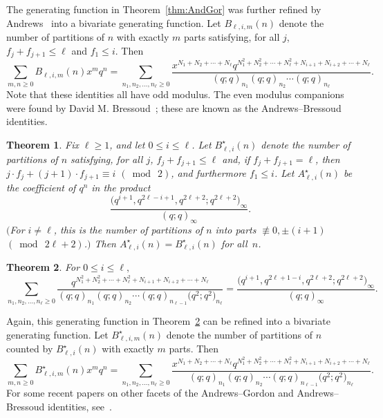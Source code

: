 \documentclass[pdftex]{sigma}
\numberwithin{equation}{section}
\newtheorem{Theorem}{Theorem}[section]
\theoremstyle{definition}
\begin{document}
The generating function in Theorem~\ref{thm:AndGor} was further refined by Andrews~\cite{AndPNAS} into a bivariate generating function. Let $B_{\ell,i,m}(n)$ denote the number of partitions of $n$ with exactly $m$ parts satisfying, for all $j$, $f_j + f_{j+1}\le \ell$ and $f_1 \le i$. Then
\begin{equation} \label{eq:AndGorxq}
\sum_{m,n \ge 0} B_{\ell,i,m}(n) x^m q^n =\sum_{n_1,n_2,\dots,n_{\ell}\ge 0} \frac{x^{N_1+N_2+\cdots+N_{\ell}}q^{N_1^2+N_2^2+\cdots+N_{\ell}^2+N_{i+1}+N_{i+2}+\cdots+N_{\ell}}}{(q;q)_{n_1}(q;q)_{n_2}\cdots(q;q)_{n_{\ell}}}.
\end{equation}
Note that these identities all have odd modulus. The even modulus companions were found by David M. Bressoud~\cite{Bress0,Bress1,Bress2}; these are known as the Andrews--Bressoud identities.
\begin{Theorem}
Fix $\ell\ge 1$, and let $0\le i\le \ell$. Let $B^\star_{\ell,i}(n)$ denote the number of partitions of $n$ satisfying, for all $j$, $f_j + f_{j+1}\le \ell$ and, if $f_j + f_{j+1}=\ell$, then $j\cdot f_j+(j+1)\cdot f_{j+1} \equiv i$ $(\bmod~2)$, and furthermore $f_1 \le i$. Let $A^\star_{\ell,i}(n)$ be the coefficient of $q^n$ in the product \[\frac{\bigl(q^{i+1},q^{2\ell-i+1},q^{2\ell+2};q^{2\ell+2}\bigr)_\infty}{(q;q)_\infty}.\] $($For $i\ne \ell$, this is the number of partitions of $n$ into parts $\not\equiv 0, \pm (i+1)$ $(\bmod~2\ell+2)$.$)$ Then $A^\star_{\ell,i}(n)=B^\star_{\ell,i}(n)$ for all~$n$.
\end{Theorem}


\begin{Theorem} \label{thm:AndBre}
For $0\le i \le \ell,$
\begin{equation*}
\sum_{n_1,n_2,\dots,n_{\ell}\ge 0} \frac{q^{N_1^2+N_2^2+\cdots+N_{\ell}^2+N_{i+1}+N_{i+2}+\cdots+N_{\ell}}}{(q;q)_{n_1}(q;q)_{n_2}\cdots(q;q)_{n_{\ell-1}}\bigl(q^2;q^2\bigr)_{n_{\ell}}} = \frac{\bigl(q^{i+1},q^{2\ell+1-i},q^{2\ell+2};q^{2\ell+2}\bigr)_\infty}{(q;q)_\infty}.
\end{equation*}
\end{Theorem}

Again, this generating function in Theorem~\ref{thm:AndBre} can be refined into a bivariate generating function. Let $B^\star_{\ell,i,m}(n)$ denote the number of partitions of $n$ counted by $B^\star_{\ell,i}(n)$ with exactly $m$ parts. Then
\begin{equation} \label{eq:AndBrexq}
\sum_{m,n \ge 0} B^\star_{\ell,i,m}(n) x^m q^n =\sum_{n_1,n_2,\dots,n_{\ell}\ge 0} \frac{x^{N_1+N_2+\cdots+N_{\ell}}q^{N_1^2+N_2^2+\cdots+N_{\ell}^2+N_{i+1}+N_{i+2}+\cdots+N_{\ell}}}{(q;q)_{n_1}(q;q)_{n_2}\cdots(q;q)_{n_{\ell-1}}\bigl(q^2;q^2\bigr)_{n_{\ell}}}.
\end{equation}
For some recent papers on other facets of the Andrews--Gordon and Andrews--Bressoud identities, see~\cite{ADJM,KLRS,KurParity,Stant,Wiecz}.
\end{document}

